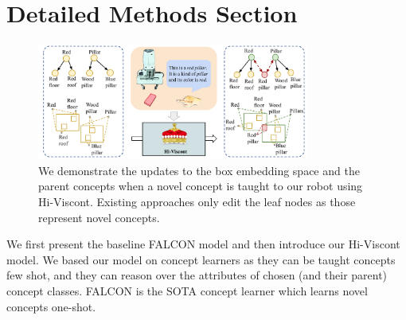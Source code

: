\appendix
\section{Detailed Methods Section}

\begin{figure}
    \centering
    \includegraphics[width=0.8\textwidth]{figures/figure2.pdf}
    \caption{We demonstrate the updates to the box embedding space and the parent concepts when a novel concept is taught to our robot using Hi-Viscont. Existing approaches only edit the leaf nodes as those represent novel concepts.}
    \label{fig:concept_net_model}
    \vspace{-5mm}
\end{figure}

We first present the baseline FALCON model and then introduce our Hi-Viscont model. We based our model on concept learners as they can be taught concepts few shot, and they can reason over the attributes of chosen (and their parent) concept classes. FALCON is the SOTA concept learner which learns novel concepts one-shot. 


